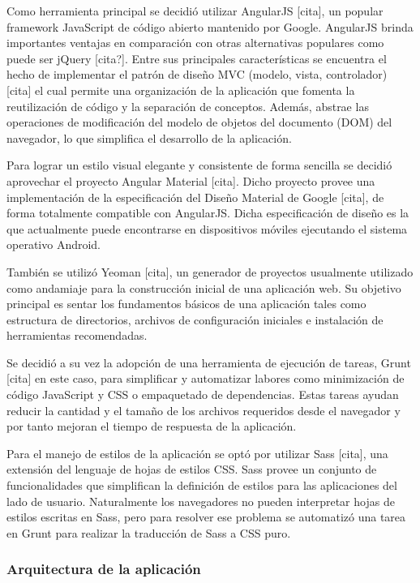 Como herramienta principal se decidió utilizar AngularJS [cita], un popular framework JavaScript de
código abierto mantenido por Google. AngularJS brinda importantes ventajas en comparación con otras
alternativas populares como puede ser jQuery [cita?]. Entre sus principales características se encuentra
el hecho de implementar el patrón de diseño MVC (modelo, vista, controlador) [cita] el cual permite una
organización de la aplicación que fomenta la reutilización de código y la separación de conceptos.
Además, abstrae las operaciones de modificación del modelo de objetos del documento (DOM) del navegador,
lo que simplifica el desarrollo de la aplicación.

Para lograr un estilo visual elegante y consistente de forma sencilla se decidió aprovechar el proyecto
Angular Material [cita]. Dicho proyecto provee una implementación de la especificación del Diseño Material
de Google [cita], de forma totalmente compatible con AngularJS. Dicha especificación de diseño es la que
actualmente puede encontrarse en dispositivos móviles ejecutando el sistema operativo Android.

También se utilizó Yeoman [cita], un generador de proyectos usualmente utilizado como andamiaje para la
construcción inicial de una aplicación web. Su objetivo principal es sentar los fundamentos básicos de
una aplicación tales como estructura de directorios, archivos de configuración iniciales e instalación
de herramientas recomendadas.

Se decidió a su vez la adopción de una herramienta de ejecución de tareas, Grunt [cita] en este caso,
para simplificar y automatizar labores como minimización de código JavaScript y CSS o empaquetado de
dependencias. Estas tareas ayudan reducir la cantidad y el tamaño de los archivos requeridos desde el
navegador y por tanto mejoran el tiempo de respuesta de la aplicación.

Para el manejo de estilos de la aplicación se optó por utilizar Sass [cita], una extensión del lenguaje
de hojas de estilos CSS. Sass provee un conjunto de funcionalidades que simplifican la definición de
estilos para las aplicaciones del lado de usuario. Naturalmente los navegadores no pueden interpretar
hojas de estilos escritas en Sass, pero para resolver ese problema se automatizó una tarea en Grunt para
realizar la traducción de Sass a CSS puro.

\subsubsection{Arquitectura de la aplicación}

